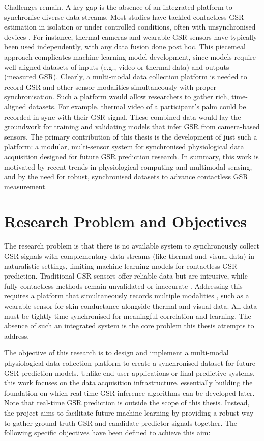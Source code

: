 Challenges remain. A key gap is the absence of an integrated platform to synchronise diverse data streams. Most studies have tackled contactless GSR estimation in isolation or under controlled conditions, often with unsynchronised devices \cite{ref7}. For instance, thermal cameras and wearable GSR sensors have typically been used independently, with any data fusion done post hoc. This piecemeal approach complicates machine learning model development, since models require well-aligned datasets of inputs (e.g., video or thermal data) and outputs (measured GSR). Clearly, a multi-modal data collection platform is needed to record GSR and other sensor modalities simultaneously with proper synchronisation. Such a platform would allow researchers to gather rich, time-aligned datasets. For example, thermal video of a participant's palm could be recorded in sync with their GSR signal. These combined data would lay the groundwork for training and validating models that infer GSR from camera-based sensors. The primary contribution of this thesis is the development of just such a platform: a modular, multi-sensor system for synchronised physiological data acquisition designed for future GSR prediction research. In summary, this work is motivated by recent trends in physiological computing and multimodal sensing, and by the need for robust, synchronised datasets to advance contactless GSR measurement.


\section{Research Problem and Objectives}
The research problem is that there is no available system to synchronously collect GSR signals with complementary data streams (like thermal and visual data) in naturalistic settings, limiting machine learning models for contactless GSR prediction. Traditional GSR sensors offer reliable data but are intrusive, while fully contactless methods remain unvalidated or inaccurate \cite{ref8}. Addressing this requires a platform that simultaneously records multiple modalities \textemdash, such as a wearable sensor for skin conductance alongside thermal and visual data. All data must be tightly time-synchronised for meaningful correlation and learning. The absence of such an integrated system is the core problem this thesis attempts to address.

The objective of this research is to design and implement a multi-modal physiological data collection platform to create a synchronised dataset for future GSR prediction models. Unlike end-user applications or final predictive systems, this work focuses on the data acquisition infrastructure, essentially building the foundation on which real-time GSR inference algorithms can be developed later. Note that real-time GSR prediction is outside the scope of this thesis. Instead, the project aims to facilitate future machine learning by providing a robust way to gather ground-truth GSR and candidate predictor signals together. The following specific objectives have been defined to achieve this aim:

